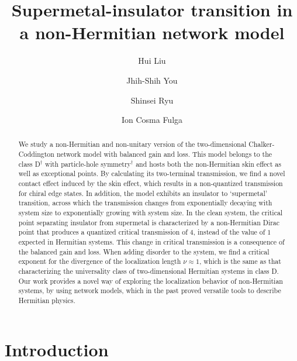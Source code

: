 \documentclass[aps,pra,reprint,superscriptaddress,showkeys,amsmath,amssymb,longbibliography]{revtex4-1}
\begin{document}
\title{Supermetal-insulator transition in a non-Hermitian network model}

\author{Hui Liu}

\author{Jhih-Shih You}

\author{Shinsei Ryu}

\author{Ion Cosma Fulga}

\begin{abstract}
We study a non-Hermitian and non-unitary version of the two-dimensional Chalker-Coddington network model with balanced gain and loss. 
This model belongs to the class D$^\dagger$ with particle-hole symmetry$^\dagger$ and hosts both the non-Hermitian skin effect as well as exceptional points.
By calculating its two-terminal transmission, we find a novel contact effect induced by the skin effect, which results in a non-quantized transmission for chiral edge states.
In addition, the model exhibits an insulator to `supermetal' transition, across which the transmission changes from exponentially decaying with system size to exponentially growing with system size.
In the clean system, the critical point separating insulator from supermetal is characterized by a non-Hermitian Dirac point that produces a quantized critical transmission of $4$, instead of the value of $1$ expected in Hermitian systems.
This change in critical transmission is a consequence of the balanced gain and loss.
When adding disorder to the system, we find a critical exponent for the divergence of the localization length $\nu\approx 1$, which is the same as that characterizing the universality class of two-dimensional Hermitian systems in class D. 
Our work provides a novel way of exploring the localization behavior of non-Hermitian systems, by using network models, which in the past proved versatile tools to describe Hermitian physics.
\end{abstract}
\maketitle

\section{Introduction}
\label{sec:introduction}
\end{document}
